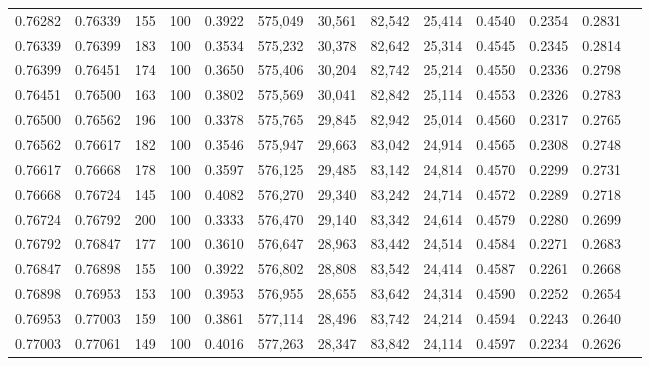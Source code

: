 \begin{tabular}{rrrrrrrrrrrrr}
0.76282 & 0.76339 &   155 & 100 &                                     0.3922 & 575,049 &  30,561 &  82,542 &  25,414 & 0.4540 & 0.2354 & 0.2831 \\
0.76339 & 0.76399 &   183 & 100 &                                     0.3534 & 575,232 &  30,378 &  82,642 &  25,314 & 0.4545 & 0.2345 & 0.2814 \\
0.76399 & 0.76451 &   174 & 100 &                                     0.3650 & 575,406 &  30,204 &  82,742 &  25,214 & 0.4550 & 0.2336 & 0.2798 \\
0.76451 & 0.76500 &   163 & 100 &                                     0.3802 & 575,569 &  30,041 &  82,842 &  25,114 & 0.4553 & 0.2326 & 0.2783 \\
0.76500 & 0.76562 &   196 & 100 &                                     0.3378 & 575,765 &  29,845 &  82,942 &  25,014 & 0.4560 & 0.2317 & 0.2765 \\
0.76562 & 0.76617 &   182 & 100 &                                     0.3546 & 575,947 &  29,663 &  83,042 &  24,914 & 0.4565 & 0.2308 & 0.2748 \\
0.76617 & 0.76668 &   178 & 100 &                                     0.3597 & 576,125 &  29,485 &  83,142 &  24,814 & 0.4570 & 0.2299 & 0.2731 \\
0.76668 & 0.76724 &   145 & 100 &                                     0.4082 & 576,270 &  29,340 &  83,242 &  24,714 & 0.4572 & 0.2289 & 0.2718 \\
0.76724 & 0.76792 &   200 & 100 &                                     0.3333 & 576,470 &  29,140 &  83,342 &  24,614 & 0.4579 & 0.2280 & 0.2699 \\
0.76792 & 0.76847 &   177 & 100 &                                     0.3610 & 576,647 &  28,963 &  83,442 &  24,514 & 0.4584 & 0.2271 & 0.2683 \\
0.76847 & 0.76898 &   155 & 100 &                                     0.3922 & 576,802 &  28,808 &  83,542 &  24,414 & 0.4587 & 0.2261 & 0.2668 \\
0.76898 & 0.76953 &   153 & 100 &                                     0.3953 & 576,955 &  28,655 &  83,642 &  24,314 & 0.4590 & 0.2252 & 0.2654 \\
0.76953 & 0.77003 &   159 & 100 &                                     0.3861 & 577,114 &  28,496 &  83,742 &  24,214 & 0.4594 & 0.2243 & 0.2640 \\
0.77003 & 0.77061 &   149 & 100 &                                     0.4016 & 577,263 &  28,347 &  83,842 &  24,114 & 0.4597 & 0.2234 & 0.2626 \\

\end{tabular}
